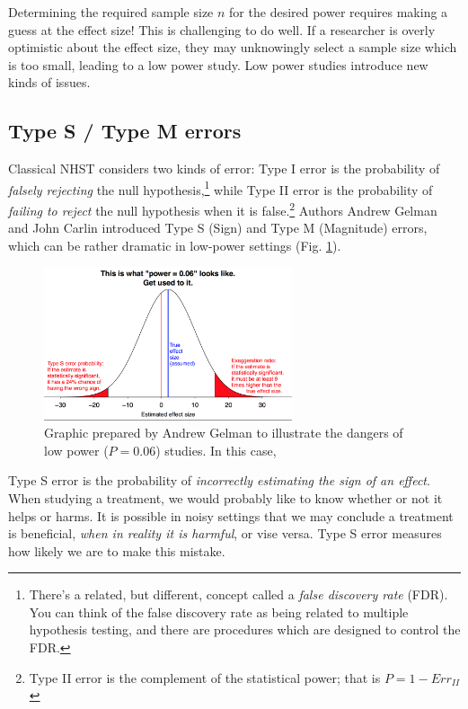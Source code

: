 \documentclass{tufte-handout}
\begin{document}
Determining the required sample size \(n\) for the desired power requires making a
guess at the effect size! This is challenging to do well. If a researcher is
overly optimistic about the effect size, they may unknowingly select a sample
size which is too small, leading to a low power study. Low power studies
introduce new kinds of issues.

\subsection{Type S / Type M errors}
\label{sec:org419301d}
Classical NHST considers two kinds of error: Type I error is the probability of
\emph{falsely rejecting} the null hypothesis,\footnote{There's a related, but different,
concept called a \emph{false discovery rate} (FDR). You can think of the false
discovery rate as being related to multiple hypothesis testing, and there are
procedures which are designed to control the FDR.} while Type II error is the
probability of \emph{failing to reject} the null hypothesis when it is
false.\footnote{Type II error is the complement of the statistical power; that is
\(P=1-Err_{II}\)} Authors Andrew Gelman and John Carlin \cite{gelman2014beyond}
introduced Type S (Sign) and Type M (Magnitude) errors, which can be rather
dramatic in low-power settings (Fig. \ref{fig:power006}).

\begin{figure}[!ht]
  \centering
  \includegraphics[width=0.65\textwidth]{images/power006}
  \caption{Graphic prepared by Andrew Gelman to illustrate the dangers of low
  power ($P=0.06$) studies. In this case, }
  \label{fig:power006}
\end{figure}

Type S error is the probability of \emph{incorrectly estimating the sign of an
effect}. When studying a treatment, we would probably like to know whether or
not it helps or harms. It is possible in noisy settings that we may conclude a
treatment is beneficial, \emph{when in reality it is harmful}, or vise versa. Type S
error measures how likely we are to make this mistake.
\end{document}
